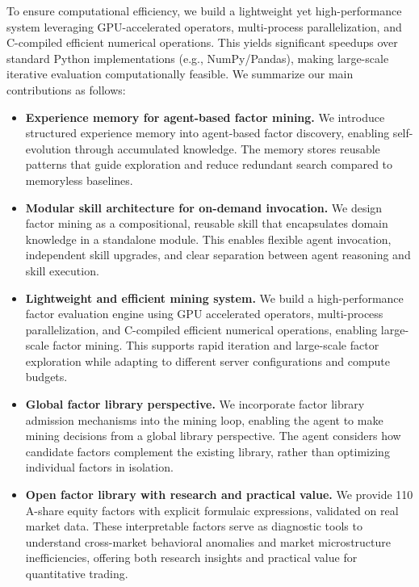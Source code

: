 \documentclass[sigconf]{acmart}
\begin{document}
To ensure computational efficiency, we build a lightweight yet high-performance system leveraging GPU-accelerated operators, multi-process parallelization, and C-compiled efficient numerical operations. This yields significant speedups over standard Python implementations (e.g., NumPy/Pandas), making large-scale iterative evaluation computationally feasible. We summarize our main contributions as follows:
{\setlength{\leftmargini}{1.4em}%
\begin{itemize}
  \setlength{\topsep}{2pt}
  \setlength{\itemsep}{1pt}
  \setlength{\parsep}{0pt}
  \item \textbf{Experience memory for agent-based factor mining.} We introduce structured experience memory into agent-based factor discovery, enabling self-evolution through accumulated knowledge. The memory stores reusable patterns that guide exploration and reduce redundant search compared to memoryless baselines.
  
  \item \textbf{Modular skill architecture for on-demand invocation.} We design factor mining as a compositional, reusable skill that encapsulates domain knowledge in a standalone module. This enables flexible agent invocation, independent skill upgrades, and clear separation between agent reasoning and skill execution.
  
  \item \textbf{Lightweight and efficient mining system.} We build a high-performance factor evaluation engine using GPU accelerated operators, multi-process parallelization, and C-compiled efficient numerical operations, enabling large-scale factor mining. This supports rapid iteration and large-scale factor exploration while adapting to different server configurations and compute budgets.
  
  \item \textbf{Global factor library perspective.} We incorporate factor library admission mechanisms into the mining loop, enabling the agent to make mining decisions from a global library perspective. The agent considers how candidate factors complement the existing library, rather than optimizing individual factors in isolation.
  
  \item \textbf{Open factor library with research and practical value.} We provide 110 A-share equity factors with explicit formulaic expressions, validated on real market data. These interpretable factors serve as diagnostic tools to understand cross-market behavioral anomalies and market microstructure inefficiencies, offering both research insights and practical value for quantitative trading.
\end{itemize}
}
\end{document}
